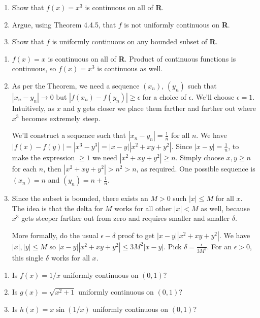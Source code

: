 \documentclass{oxmathproblems}
\begin{document}
\begin{questions}

\miquestion 
\begin{enumerate}[label=(\alph*)]
  \item Show that $f(x)=x^3$ is continuous on all of \textbf{R}.
  \item Argue, using Theorem 4.4.5, that $f$ is not uniformly continuous on \textbf{R}.
  \item Show that $f$ is uniformly continuous on any bounded subset of \textbf{R}.
\end{enumerate}

\begin{solution}
  \begin{enumerate}[label=(\alph*)]
    \item $f(x)=x$ is continuous on all of \textbf{R}. Product of continuous functions is continuous, so $f(x)=x^3$ is continuous as well.
    \item As per the Theorem, we need a sequence $(x_{n})$, $(y_{n})$ such that $|x_{n}-y_{n}| \to 0$ but $|f(x_{n})-f(y_{n})| \geq \epsilon$ for a choice of $\epsilon$.
    We'll choose $\epsilon=1$. Intuitively, as $x$ and $y$ gets closer we place them farther and farther out where $x^3$ becomes extremely steep.

    We'll construct a sequence such that $|x_{n}-y_{n}| = \frac{1}{n}$ for all $n$. We have $|f(x)-f(y)|=|x^3-y^3|=|x-y||x^2+xy+y^2|$.
    Since $|x-y| = \frac{1}{n}$, to make the expression $\geq 1$ we need $|x^2+xy+y^2| \geq n$. Simply choose $x, y \geq n$ for each $n$,
    then $|x^2+xy+y^2| > n^2 > n$, as required. One possible sequence is $(x_{n})=n$ and $(y_{n})=n+\frac{1}{n}$.

    \item Since the subset is bounded, there exists an $M > 0$ such $|x| \leq M$ for all $x$. The idea is that the delta for $M$ works for all other $|x| < M$ as well, 
    because $x^3$ gets steeper farther out from zero and requires smaller and smaller $\delta$.

    More formally, do the usual $\epsilon-\delta$ proof to get $|x-y||x^2+xy+y^2|$. We have $|x|, |y| \leq M$ so $|x-y||x^2+xy+y^2| \leq 3M^2|x-y|$. Pick $\delta=\frac{\epsilon}{3M^2}$.
    For an $\epsilon > 0$, this single $\delta$ works for all $x$.
  \end{enumerate}
\end{solution}

\miquestion
\begin{enumerate}[label=(\alph*)]
  \item Is $f(x)=1/x$ uniformly continuous on $(0, 1)$?
  \item Is $g(x)=\sqrt{x^2+1}$ uniformly continuous on $(0, 1)$?
  \item Is $h(x)=x \sin(1/x)$ uniformly continuous on $(0, 1)$?
\end{enumerate}


\end{questions}
\end{document}
